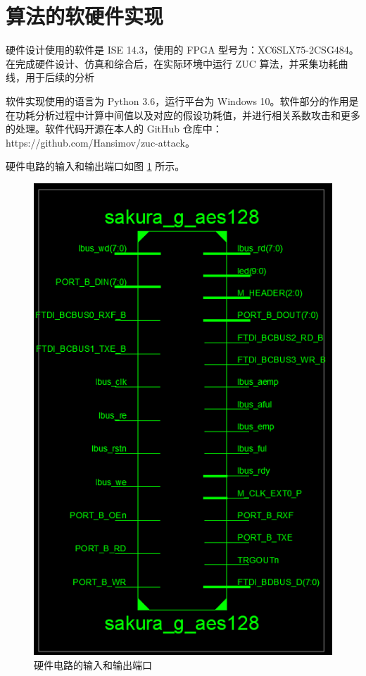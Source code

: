 \section{算法的软硬件实现}

硬件设计使用的软件是 ISE 14.3，使用的 FPGA 型号为：XC6SLX75-2CSG484。在完成硬件设计、仿真和综合后，在实际环境中运行 ZUC 算法，并采集功耗曲线，用于后续的分析

软件实现使用的语言为 Python 3.6，运行平台为 Windows 10。软件部分的作用是在功耗分析过程中计算中间值以及对应的假设功耗值，并进行相关系数攻击和更多的处理。软件代码开源在本人的 GitHub 仓库中：https://github.com/Hansimov/zuc-attack。

\newpage

硬件电路的输入和输出端口如图 \ref{fig:circuit_io} 所示。

\begin{figure}[htbp]
    \centering
    \includegraphics[height=.6\textheight]{../images/circuit_io.png}
    \caption{硬件电路的输入和输出端口}
    \label{fig:circuit_io}
\end{figure}

